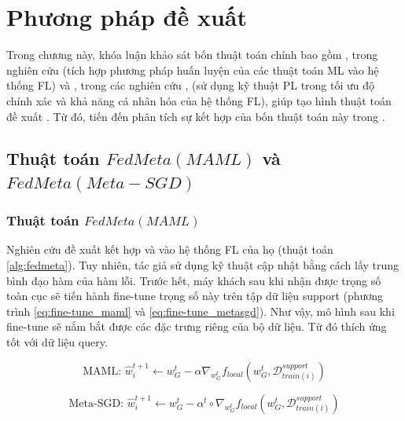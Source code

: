 \chapter{Phương pháp đề xuất}
\label{Chapter3}


Trong chương này, khóa luận khảo sát bốn thuật toán chính bao gồm ,  trong nghiên cứu \cite{chen2018federated} (tích hợp phương pháp huấn luyện của các thuật toán ML vào hệ thống FL) và ,  trong các nghiên cứu \cite{arivazhagan2019federated}, \cite{liang2020think} (sử dụng kỹ thuật PL trong tối ưu độ chính xác và khả năng cá nhân hóa của hệ thống FL), giúp tạo hình thuật toán đề xuất . Từ đó, tiến đến phân tích sự kết hợp của bốn thuật toán này trong .

\section{Thuật toán $FedMeta(MAML)$ và $FedMeta(Meta-SGD)$}

\subsection{Thuật toán $FedMeta(MAML)$}

Nghiên cứu \cite{chen2018federated} đề xuất kết hợp  và  vào hệ thống FL của họ (thuật toán \ref{alg:fedmeta}). Tuy nhiên, tác giả sử dụng kỹ thuật cập nhật bằng cách lấy trung bình đạo hàm của hàm lỗi. Trước hết, máy khách sau khi nhận được trọng số toàn cục sẽ tiến hành fine-tune trọng số này trên tập dữ liệu support (phương trình \ref{eq:fine-tune_maml} và \ref{eq:fine-tune_metasgd}). Như vậy, mô hình sau khi fine-tune sẽ nắm bắt được các đặc trưng riêng của bộ dữ liệu. Từ đó thích ứng tốt với dữ liệu query.

\begin{dmath}
    \label{eq:fine-tune_maml}
    \text{MAML: } \hat{w}_i^{t+1} \gets w_G^t - \alpha\nabla_{w_G^t} f_{local}(w_G^t, \mathcal{D}_{train(i)}^{support})
\end{dmath}

\begin{dmath}
    \label{eq:fine-tune_metasgd}
    \text{Meta-SGD: } \hat{w}_i^{t+1} \gets w_G^t - \alpha^t \circ \nabla_{w_G^t} f_{local}(w_G^t, \mathcal{D}_{train(i)}^{support})
\end{dmath}

